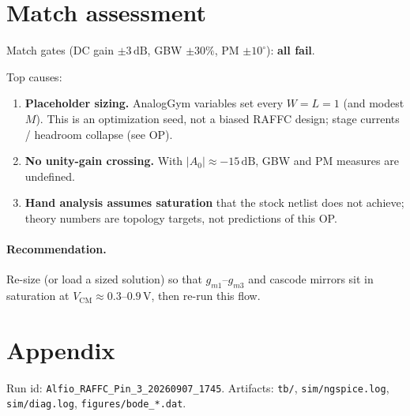 \documentclass[11pt]{article}
\begin{document}
\section{Match assessment}
Match gates (DC gain $\pm3\,\mathrm{dB}$, GBW $\pm30\%$, PM $\pm10^\circ$): \textbf{all fail}.

Top causes:
\begin{enumerate}
  \item \textbf{Placeholder sizing.} AnalogGym variables set every $W{=}L{=}1$ (and modest $M$). This is an optimization seed, not a biased RAFFC design; stage currents / headroom collapse (see OP).
  \item \textbf{No unity-gain crossing.} With $|A_0|{\approx}-15\,\mathrm{dB}$, GBW and PM measures are undefined.
  \item \textbf{Hand analysis assumes saturation} that the stock netlist does not achieve; theory numbers are topology targets, not predictions of this OP.
\end{enumerate}

\paragraph{Recommendation.} Re-size (or load a sized solution) so that $g_{m1}$--$g_{m3}$ and cascode mirrors sit in saturation at $V_{\mathrm{CM}}{\approx}0.3$--$0.9\,\mathrm{V}$, then re-run this flow.

\section{Appendix}
Run id: \texttt{Alfio\_RAFFC\_Pin\_3\_20260907\_1745}.
Artifacts: \texttt{tb/}, \texttt{sim/ngspice.log}, \texttt{sim/diag.log}, \texttt{figures/bode\_*.dat}.
\end{document}
